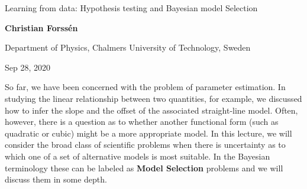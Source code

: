 \documentclass[%
oneside,                 %
final,                   %
10pt]{article}
\begin{document}

\newcommand{\exercisesection}[1]{\subsection*{#1}}







\thispagestyle{empty}

\begin{center}
{\LARGE\bf
\begin{spacing}{1.25}
Learning from data: Hypothesis testing and Bayesian model Selection
\end{spacing}
}
\end{center}


\begin{center}
{\bf Christian Forssén}
\end{center}

    \begin{center}
\centerline{{\small Department of Physics, Chalmers University of Technology, Sweden}}
\end{center}
    

\begin{center}
Sep 28, 2020
\end{center}

\vspace{1cm}


So far, we have been concerned with the problem of parameter estimation. In studying the linear relationship between two quantities, for example, we discussed how to infer the slope and the offset of the associated straight-line model. Often, however, there is a question as to whether another functional form (such as quadratic or cubic) might be a more appropriate model. In this lecture, we will consider the broad class of scientific problems when there is uncertainty as to which one of a set of alternative models is most suitable. In the Bayesian terminology these can be labeled as \textbf{Model Selection} problems and we will discuss them in some depth.
\end{document}
